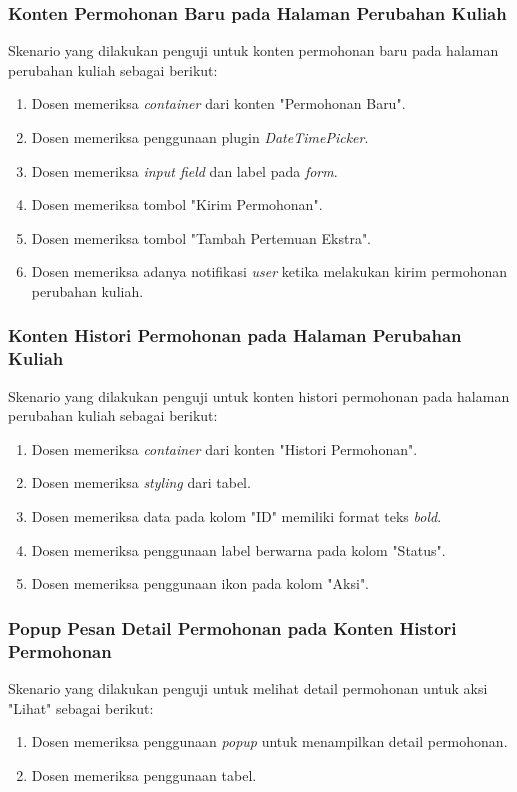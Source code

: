 \subsubsection{Konten Permohonan Baru pada Halaman Perubahan Kuliah}
Skenario yang dilakukan penguji untuk konten permohonan baru pada halaman perubahan kuliah sebagai berikut:
\begin{enumerate}
	\item Dosen memeriksa \textit{container} dari konten "Permohonan Baru".
	\item Dosen memeriksa penggunaan plugin \textit{DateTimePicker}.
	\item Dosen memeriksa \textit{input field} dan label pada \textit{form}.
	\item Dosen memeriksa tombol "Kirim Permohonan".	
	\item Dosen memeriksa tombol "Tambah Pertemuan Ekstra".
	\item Dosen memeriksa adanya notifikasi \textit{user} ketika melakukan kirim permohonan perubahan kuliah.
\end{enumerate}

\subsubsection{Konten Histori Permohonan pada Halaman Perubahan Kuliah}
Skenario yang dilakukan penguji untuk konten histori permohonan pada halaman perubahan kuliah sebagai berikut:
\begin{enumerate}
	\item Dosen memeriksa \textit{container} dari konten "Histori Permohonan".
	\item Dosen memeriksa \textit{styling} dari tabel.	
	\item Dosen memeriksa data pada kolom "ID" memiliki format teks \textit{bold}.
	\item Dosen memeriksa penggunaan label berwarna pada kolom "Status".			
	\item Dosen memeriksa penggunaan ikon pada kolom "Aksi".
\end{enumerate}

\subsubsection{Popup Pesan Detail Permohonan pada Konten Histori Permohonan}
Skenario yang dilakukan penguji untuk melihat detail permohonan untuk aksi "Lihat" sebagai berikut:
\begin{enumerate}
	\item Dosen memeriksa penggunaan \textit{popup} untuk menampilkan detail permohonan.
	\item Dosen memeriksa penggunaan tabel.	
\end{enumerate}

